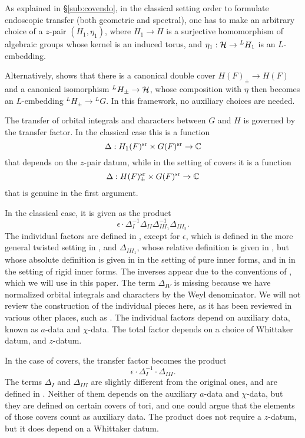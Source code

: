 \documentclass{article}
\theoremstyle{definition}
\numberwithin{equation}{section}
\renewcommand{\-}{\hyp{}}
\begin{document}
As explained in \S\ref{sub:covendo}, in the classical setting order to formulate endoscopic transfer (both geometric and spectral), one has to make an arbitrary choice of a $z$-pair $(H_1,\eta_1)$, where $H_1 \to H$ is a surjective homomorphism of algebraic groups whose kernel is an induced torus, and $\eta_1 : \mathcal{H} \to {^LH_1}$ is an $L$\-embedding. 

Alternatively, \cite{KalHDC} shows that there is a canonical double cover $H(F)_\pm \to H(F)$ and a canonical isomorphism $^LH_\pm \to \mathcal{H}$, whose composition with $\eta$ then becomes an $L$\-embedding $^LH_\pm \to {^LG}$. In this framework, no auxiliary choices are needed.

The transfer of orbital integrals and characters between $G$ and $H$ is governed by the transfer factor. In the classical case this is a function
\[ \Delta : H_1(F)^{\textrm{sr}} \times G(F)^{\textrm{sr}} \to \mathbb{C} \]
that depends on the $z$-pair datum, while in the setting of covers it is a function
\[ \Delta : H(F)_\pm^{\textrm{sr}} \times G(F)^{\textrm{sr}} \to \mathbb{C} \]
that is genuine in the first argument. 

In the classical case, it is given as the product
\[ \epsilon \cdot \Delta_I^{-1}\Delta_{II}\Delta_{III_1}^{-1}\Delta_{III_2}. \]
The individual factors are defined in \cite{LS87}, except for $\epsilon$, which is defined in the more general twisted setting in \cite[\S5.3]{KS99}, and $\Delta_{III_1}$, whose relative definition is given in \cite{LS87}, but whose absolute definition is given in \cite{KalECI} in the setting of pure inner forms, and in \cite{KalRI} in the setting of rigid inner forms. The inverses appear due to the conventions of \cite[(1.0.4)]{KS12}, which we will use in this paper. The term $\Delta_{IV}$ is missing because we have normalized orbital integrals and characters by the Weyl denominator. We will not review the construction of the individual pieces here, as it has been reviewed in various other places, such as \cite[\S3.5,\S4.2,\S4.3]{KalIMS}. The individual factors depend on auxiliary data, known as $a$-data and $\chi$-data. The total factor depends on a choice of Whittaker datum, and $z$-datum.

In the case of covers, the transfer factor becomes the product
\[ \epsilon \cdot \Delta_I^{-1} \cdot \Delta_{III}.\]
The terms $\Delta_I$ and $\Delta_{III}$ are slightly different from the original ones, and are defined in \cite[\S4.3]{KalHDC}. Neither of them depends on the auxiliary $a$-data and $\chi$-data, but they are defined on certain covers of tori, and one could argue that the elements of those covers count as auxiliary data. The product does not require a $z$-datum, but it does depend on a Whittaker datum.
\end{document}
